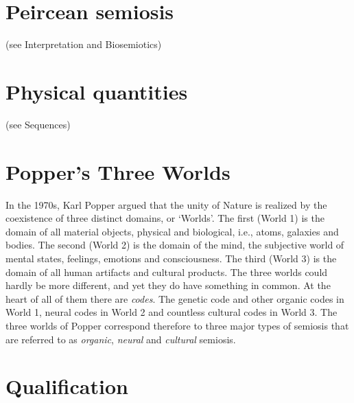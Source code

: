 \documentclass[12pt]{article}
\begin{document}
\section{Peircean semiosis} (see Interpretation and Biosemiotics)


\section{Physical quantities} (see Sequences)


\section{Popper's Three Worlds} 
In the 1970s, Karl Popper argued that the unity of Nature is realized by the coexistence of three distinct domains, or `Worlds'. The first (World 1) is the domain of all material objects, physical and biological, i.e., atoms, galaxies and bodies. The second (World 2) is the domain of the mind, the subjective world of mental states, feelings, emotions and consciousness. The third (World 3) is the domain of all human artifacts and cultural products. The three worlds could hardly be more different, and yet they do have something in common. At the heart of all of them there are \textit{codes}. The genetic code and other organic codes in World 1, neural codes in World 2 and countless cultural codes in World 3. The three worlds of Popper correspond therefore to three major types of semiosis that are referred to as \textit{organic}, \textit{neural} and \textit{cultural} semiosis. 

\hypertarget{qualification}{}
\section{Qualification}
\end{document}
